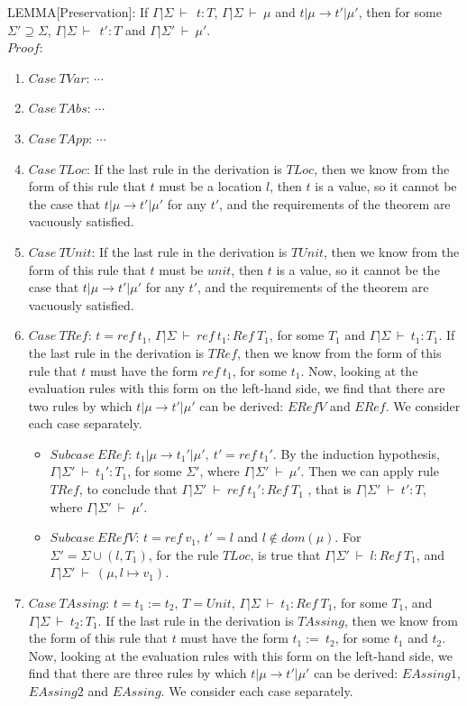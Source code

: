 \documentclass [proof]{article}
\newcommand{\tto}{\longrightarrow}
\newcommand{\envEP}{{\Gamma | \Sigma \ \vdash \ }}
\newcommand{\envEPP}{{\Gamma | \Sigma' \ \vdash \ }}
\begin{document}
LEMMA[Preservation]: If $\envEP \ t : T$, $\envEP \mu$ and $t|\mu \tto t'|\mu'$, then for some $\Sigma' \supseteq \Sigma$, $\envEP \ t' : T$ and $\envEPP \mu'$.\\
$Proof$:
\begin{enumerate}
\item $Case \ TVar$: $\cdots$
\item $Case \ TAbs$: $\cdots$
\item $Case \ TApp$: $\cdots$
\item $Case \ TLoc$: If the last rule in the derivation is $TLoc$, then we know from the form of this rule that $t$ must be a location $l$, then $t$ is a value, so it cannot be the case that $t | \mu \tto t'| \mu'$ for any $t'$, and the requirements of the theorem are vacuously satisfied.
\item $Case \ TUnit$: If the last rule in the derivation is $TUnit$, then we know from the form of this rule that $t$ must be $unit$, then $t$ is a value, so it cannot be the case that $t | \mu \tto t'| \mu'$ for any $t'$, and the requirements of the theorem are vacuously satisfied.
\item $Case \ TRef$: $t = ref \ t_1$, $ \envEP ref \ t_1 : Ref \ T_1$, for some $T_1$ and $\envEP t_1 : T_1$. If the last rule in the derivation is $TRef$, then we know from the form of this rule that $t$ must have the form $ref \ t_1$, for some $t_1$. Now, looking at the evaluation rules with this form on the left-hand side, we find that there are two rules by which $t|\mu \tto t'|\mu'$ can be derived: $ERefV$ and $ERef$. We consider each case separately.
\begin{itemize}
\item $Subcase \ ERef$: $t_1|\mu \tto t_1'|\mu', \ t' = ref \ t_1'$. By the induction hypothesis, $\envEPP t_1' : T_1$, for some $\Sigma'$,  where $\envEPP \mu'$. Then we can apply rule $TRef$, to conclude that $\envEPP ref \ t_1' : Ref \ T_1 $ , that is $\envEPP t' : T$, where $\envEPP \mu'$.
\item $Subcase \ ERefV$: $t = ref \ v_1$, $t' = l$ and $l \not\in dom(\mu)$. For $\Sigma' = \Sigma \cup (l, T_1)$, for the rule $TLoc$, is true that $\envEPP l : Ref \ T_1$, and $\envEPP (\mu, l \mapsto v_1)$.
\end{itemize}
\item $Case \ TAssing$: $t = t_1:= t_2$, $T = Unit$, $\envEP t_1 : Ref \ T_1$, for some $T_1$, and $\envEP t_2 : T_1$. If the last rule in the derivation is $TAssing$, then we know from the form of this rule that $t$ must have the form $t_1:= \ t_2$, for some $t_1$ and $t_2$. Now, looking at the evaluation rules with this form on the left-hand side, we find that there are three rules by which $t|\mu \tto t'|\mu'$ can be derived: $EAssing1$, $EAssing2$ and $EAssing$. We consider each case separately.

\end{enumerate}
\end{document}
